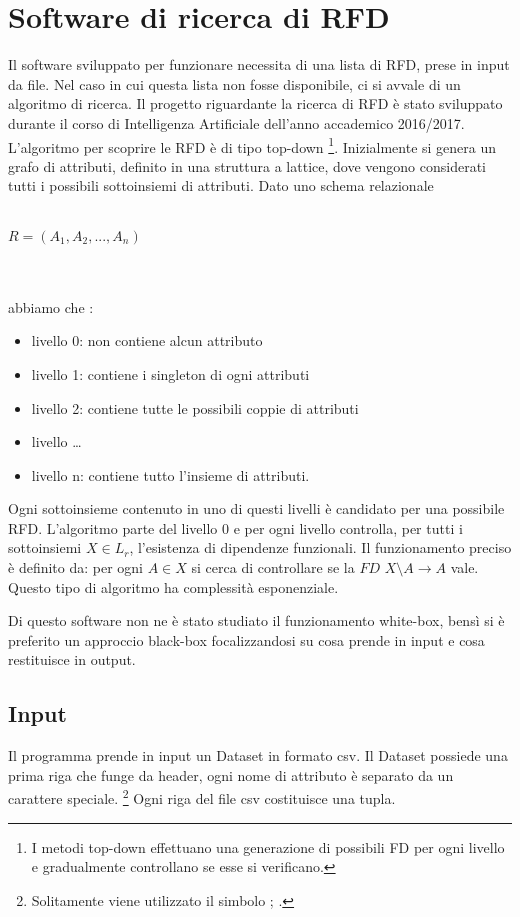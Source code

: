 \section{Software di ricerca di RFD}
Il software sviluppato per funzionare necessita di una lista di RFD, prese in input da file. Nel caso in cui questa lista non fosse disponibile, ci si avvale di un algoritmo di ricerca.
Il progetto riguardante la ricerca di RFD è stato sviluppato durante il corso di Intelligenza Artificiale dell’anno accademico 2016/2017.
L’algoritmo per scoprire le RFD è di tipo top-down \footnote{I metodi top-down effettuano una generazione di possibili FD per ogni livello e gradualmente controllano se esse si verificano.}.
Inizialmente si genera un grafo di attributi, definito in una struttura a lattice, dove vengono considerati tutti i possibili sottoinsiemi di attributi. Dato uno schema relazionale
\\~\\ 
\centerline{$R=(A_1,A_2,...,A_n)$}
\\~\\
abbiamo che :
\begin{itemize}[noitemsep]
\item livello 0: non contiene alcun attributo
\item livello 1: contiene i singleton di ogni attributi
\item livello 2: contiene tutte le possibili coppie di attributi
\item livello \ldots
\item livello n: contiene tutto l’insieme di attributi.
\end{itemize}
Ogni sottoinsieme contenuto in uno di questi livelli è candidato per una possibile RFD.
L’algoritmo parte del livello 0  e per ogni livello controlla, per tutti i sottoinsiemi $X \in L_r$, l’esistenza di dipendenze funzionali.
Il funzionamento preciso è definito da:
per ogni $A \in X$ si cerca di controllare se la $FD$  $X\setminus A \xrightarrow{}  A $ vale. Questo tipo di algoritmo ha complessità esponenziale.

Di questo software non ne è stato studiato il funzionamento white-box, bensì si è preferito un approccio black-box focalizzandosi su cosa prende in input e cosa restituisce in output.

\subsection{Input}
Il programma prende in input un Dataset in formato csv.
Il Dataset possiede una prima riga che funge da header, ogni nome di attributo è separato da un carattere speciale. \footnote{Solitamente viene utilizzato il simbolo  ; .}
Ogni riga del file csv costituisce una tupla.

